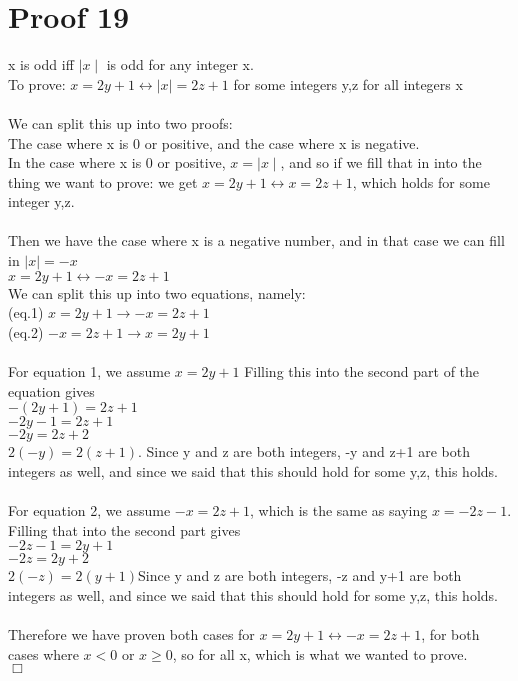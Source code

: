 \documentclass{article}
\begin{document}
\section{Proof 19}
x is odd iff $\mid x\mid$ is odd for any integer x.\\
To prove: $x=2y+1 \leftrightarrow \mid x \mid = 2z+1$ for some integers y,z for all integers x\\
\\
We can split this up into two proofs:\\
The case where x is 0 or positive, and the case where x is negative.\\
In the case where x is 0 or positive, $x = \mid x \mid$, and so if we fill that in into the thing we want to prove: we get $x=2y+1 \leftrightarrow x=2z+1$, which holds for some integer y,z.\\
\\
Then we have the case where x is a negative number, and in that case we can fill in $\mid x \mid = -x$\\
$x=2y+1 \leftrightarrow -x = 2z+1$\\
We can split this up into two equations, namely:\\
(eq.1) $x=2y+1 \rightarrow -x = 2z+1$\\
(eq.2) $-x = 2z+1 \rightarrow x=2y+1$\\
\\
For equation 1, we assume $x=2y+1$
Filling this into the second part of the equation gives\\
$-(2y+1) = 2z+1$\\
$-2y-1 = 2z+1$\\
$-2y = 2z+2$\\
$2(-y) = 2(z+1)$. Since y and z are both integers, -y and z+1 are both integers as well, and since we said that this should hold for some y,z, this holds.\\
\\
For equation 2, we assume $-x = 2z+1$, which is the same as saying $x = -2z-1$. Filling that into the second part gives \\
$-2z-1 = 2y+1$\\
$-2z = 2y+2$\\
$2(-z) = 2(y+1)$Since y and z are both integers, -z and y+1 are both integers as well, and since we said that this should hold for some y,z, this holds.\\
\\
Therefore we have proven both cases for $x=2y+1 \leftrightarrow -x = 2z+1$, for both cases where $x<0$ or $x \geq 0$, so for all x, which is what we wanted to prove.\\
$\Box$
\end{document}

